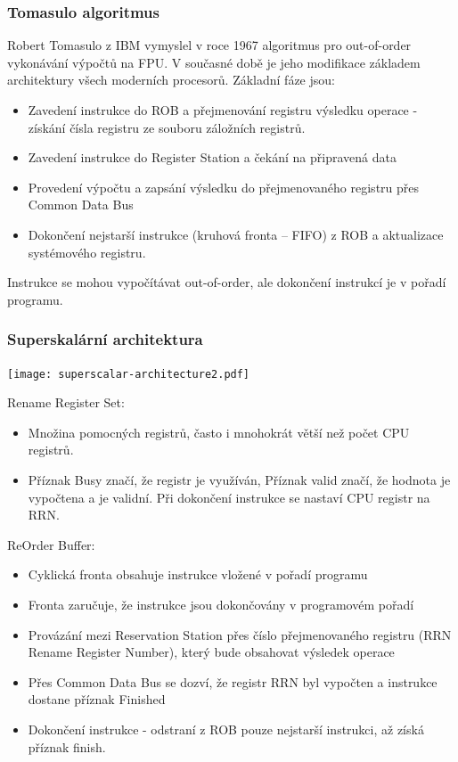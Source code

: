 \documentclass{beamer}
\begin{document}
\begin{frame}
\frametitle{Tomasulo algoritmus}

Robert Tomasulo z IBM vymyslel v roce 1967 algoritmus pro out-of-order vykonávání výpočtů na FPU.
V současné době je jeho modifikace základem architektury všech moderních procesorů.
Základní fáze jsou:
\begin{itemize}
\item Zavedení instrukce do ROB a přejmenování registru výsledku operace - získání čísla registru ze souboru záložních registrů. 
\item Zavedení instrukce do Register Station a čekání na připravená data
\item Provedení výpočtu a zapsání výsledku do přejmenovaného registru přes Common Data Bus
\item Dokončení nejstarší instrukce (kruhová fronta -- FIFO) z ROB a aktualizace systémového registru.
\end{itemize}
Instrukce se mohou vypočítávat out-of-order, ale dokončení instrukcí je v pořadí programu.
\end{frame}

\begin{frame}
\frametitle{Superskalární architektura}

\begin{center}
\texttt{[image: superscalar-architecture2.pdf]}
\end{center}

\scriptsize
Rename Register Set:
\begin{itemize}
\item Množina pomocných registrů, často i mnohokrát větší než počet CPU registrů.
\item Příznak Busy značí, že registr je využíván, Příznak valid značí, že hodnota je vypočtena a je validní. Při dokončení instrukce se nastaví CPU registr na RRN.
\end{itemize}

ReOrder Buffer:
\begin{itemize}
\item Cyklická fronta obsahuje instrukce vložené v pořadí programu
\item Fronta zaručuje, že instrukce jsou dokončovány v programovém pořadí
\item Provázání mezi Reservation Station přes číslo přejmenovaného registru (RRN Rename Register Number), který bude obsahovat výsledek operace
\item Přes Common Data Bus se dozví, že registr RRN byl vypočten a instrukce dostane příznak Finished
\item Dokončení instrukce - odstraní z ROB pouze nejstarší instrukci, až získá příznak finish.
\end{itemize}


\end{frame}
\end{document}
